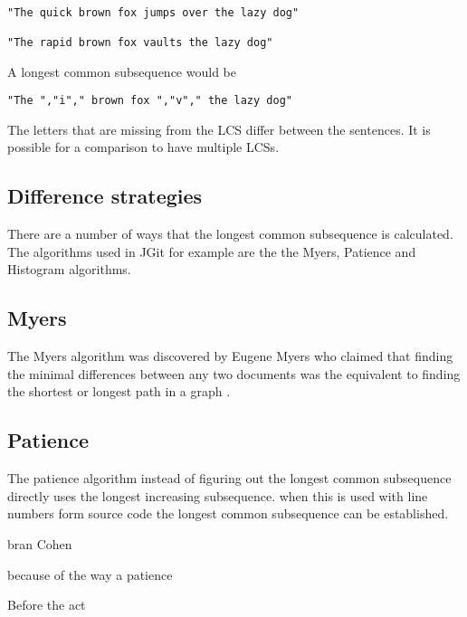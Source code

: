\begin{verbatim}

"The quick brown fox jumps over the lazy dog"

"The rapid brown fox vaults the lazy dog"

\end{verbatim}
A longest common subsequence would be
\begin{verbatim}
"The ","i"," brown fox ","v"," the lazy dog"
\end{verbatim}
The letters that are missing from the LCS differ between the sentences.
It is possible for a comparison to have multiple LCSs.

\subsection{Difference strategies}
There are a number of ways that the longest common subsequence is calculated. The algorithms used in JGit for example are the the Myers, Patience and Histogram algorithms.

\subsection{Myers}
The Myers algorithm was discovered by Eugene Myers who claimed that finding the minimal differences between any two documents was the equivalent to finding the shortest or longest path in a graph \cite{Myers1986}.

\subsection{Patience}
The patience algorithm instead of figuring out the longest common subsequence directly uses the longest increasing subsequence.
when this is used with line numbers form source code the longest common subsequence can be established.

bran Cohen

because of the way a patience 

Before the act

